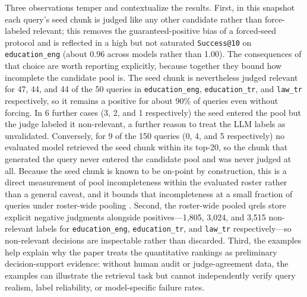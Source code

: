Three observations temper and contextualize the results. First, in this snapshot each query's seed chunk is judged like any other candidate rather than force-labeled relevant; this removes the guaranteed-positive bias of a forced-seed protocol and is reflected in a high but not saturated \texttt{Success@10} on \texttt{education\_eng} (about 0.96 across models rather than 1.00). The consequences of that choice are worth reporting explicitly, because together they bound how incomplete the candidate pool is. The seed chunk is nevertheless judged relevant for 47, 44, and 44 of the 50 queries in \texttt{education\_eng}, \texttt{education\_tr}, and \texttt{law\_tr} respectively, so it remains a positive for about 90\% of queries even without forcing. In 6 further cases (3, 2, and 1 respectively) the seed entered the pool but the judge labeled it non-relevant, a further reason to treat the LLM labels as unvalidated. Conversely, for 9 of the 150 queries (0, 4, and 5 respectively) no evaluated model retrieved the seed chunk within its top-20, so the chunk that generated the query never entered the candidate pool and was never judged at all. Because the seed chunk is known to be on-point by construction, this is a direct measurement of pool incompleteness within the evaluated roster rather than a general caveat, and it bounds that incompleteness at a small fraction of queries under roster-wide pooling \citep{zobel1998reliable, buckley2004retrieval}. Second, the roster-wide pooled qrels store explicit negative judgments alongside positives---1{,}805, 3{,}024, and 3{,}515 non-relevant labels for \texttt{education\_eng}, \texttt{education\_tr}, and \texttt{law\_tr} respectively---so non-relevant decisions are inspectable rather than discarded. Third, the examples help explain why the paper treats the quantitative rankings as preliminary decision-support evidence: without human audit or judge-agreement data, the examples can illustrate the retrieval task but cannot independently verify query realism, label reliability, or model-specific failure rates.
